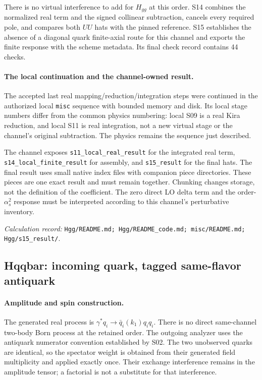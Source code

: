 \documentclass[11pt,a4paper]{article}
\newcommand{\as}{\alpha_s}
\newcommand{\code}[1]{{\small\nolinkurl{#1}}}
\newcommand{\pathref}[1]{\par{\footnotesize\textit{Calculation record:} \code{#1}.}\par}
\begin{document}
There is no virtual interference to add for $H_{gg}$ at this order. S14 combines the normalized real term and the signed collinear subtraction, cancels every required pole, and compares both $UU$ hats with the pinned reference. S15 establishes the absence of a diagonal quark finite-axial route for this channel and exports the finite response with the scheme metadata. Its final check record contains 44 checks.

\paragraph{The local continuation and the channel-owned result.}
The accepted last real mapping/reduction/integration steps were continued in the authorized local \code{misc} sequence with bounded memory and disk. Its local stage numbers differ from the common physics numbering: local S09 is a real Kira reduction, and local S11 is real integration, not a new virtual stage or the channel's original subtraction. The physics remains the sequence just described.

The channel exposes \code{s11_local_real_result} for the integrated real term, \code{s14_local_finite_result} for assembly, and \code{s15_result} for the final hats. The final result uses small native index files with companion piece directories. These pieces are one exact result and must remain together. Chunking changes storage, not the definition of the coefficient. The zero direct LO delta term and the order-$\as^2$ response must be interpreted according to this channel's perturbative inventory.
\pathref{Hgg/README.md; Hgg/README_code.md; misc/README.md; Hgg/s15_result/}

\subsection{Hqqbar: incoming quark, tagged same-flavor antiquark}
\paragraph{Amplitude and spin construction.}
The generated real process is $\gamma^*q_i\to\bar q_i(k_1)q_iq_i$. There is no direct same-channel two-body Born process at the retained order. The outgoing analyzer uses the antiquark numerator convention established by S02. The two unobserved quarks are identical, so the spectator weight is obtained from their generated field multiplicity and applied exactly once. Their exchange interference remains in the amplitude tensor; a factorial is not a substitute for that interference.
\end{document}
